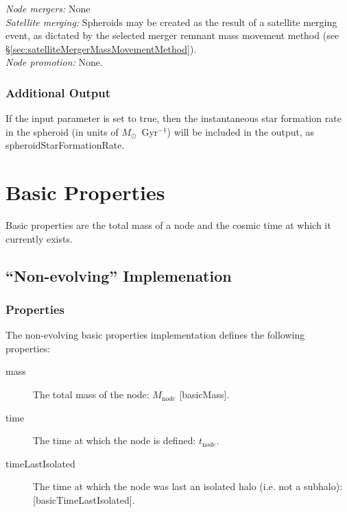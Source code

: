 \noindent\emph{Node mergers:} None\\

\noindent\emph{Satellite merging:} Spheroids may be created as the result of a satellite merging event, as dictated by the selected merger remnant mass movement method (see \S\ref{sec:satelliteMergerMassMovementMethod}).\\

\noindent\emph{Node promotion:} None.\\

\subsubsection{Additional Output}

If the {\normalfont \ttfamily [spheroidOutputStarFormationRate]} input parameter is set to true, then the instantaneous star formation rate in the spheroid (in units of $M_\odot$~Gyr$^{-1}$) will be included in the output, as {\normalfont \ttfamily spheroidStarFormationRate}.

\section{Basic Properties}\label{sec:ComponentBasicProperties}

Basic properties are the total mass of a \gls{node} and the cosmic time at which it currently exists.

\subsection{``Non-evolving'' Implemenation}

\subsubsection{Properties}

The non-evolving basic properties implementation defines the following properties:
\begin{description}
 \item [{\normalfont \ttfamily mass}] The total mass of the node: $M_{\mathrm node}$ [{\normalfont \ttfamily basicMass}].
 \item [{\normalfont \ttfamily time}] The time at which the \gls{node} is defined: $t_{\mathrm node}$.
 \item [{\normalfont \ttfamily timeLastIsolated}] The time at which the \gls{node} was last an isolated halo (i.e. not a subhalo): [\normalfont \ttfamily basicTimeLastIsolated].
\end{description}

